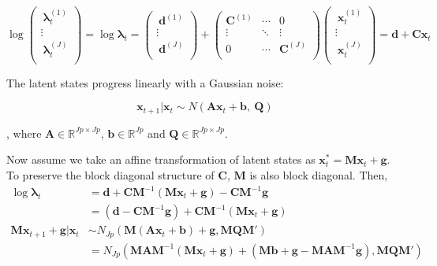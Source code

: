 \documentclass[]{article}
\begin{document}
\[\log{\begin{pmatrix}
		\ \bm{\lambda}_{t}^{(1)} \\
		\vdots \\
		\ \bm{\lambda}_{t}^{(J)} \\
	\end{pmatrix} =}\log\bm{\lambda}_{t} = \begin{pmatrix}
	\ \mathbf{d}^{(1)} \\
	\vdots \\
	\ \mathbf{d}^{(J)} \\
\end{pmatrix} + \begin{pmatrix}
	\mathbf{C}^{(1)} & \cdots & 0 \\
	\vdots & \ddots & \vdots \\
	0 & \cdots & \mathbf{C}^{(J)} \\
\end{pmatrix}\begin{pmatrix}
	\ \mathbf{x}_{t}^{(1)} \\
	\vdots \\
	\ \mathbf{x}_{t}^{(J)} \\
\end{pmatrix} = \mathbf{d} + \mathbf{C}\mathbf{x}_{t}\]

The latent states progress linearly with a Gaussian noise:

\[\mathbf{x}_{t + 1}|\mathbf{x}_{t} \sim N(\mathbf{A}\mathbf{x}_{t} + \mathbf{b},\ \mathbf{Q})\]

, where \(\mathbf{A} \in \mathbb{R}^{Jp \times Jp}\),
\(\mathbf{b} \in \mathbb{R}^{Jp}\) and
\(\mathbf{Q} \in \mathbb{R}^{Jp \times Jp}\).

Now assume we take an affine transformation of latent states as
\(\mathbf{x}_{t}^{*} = \mathbf{M}\mathbf{x}_{t} + \mathbf{g}\). To
preserve the block diagonal structure of \(\mathbf{C}\), \(\mathbf{M}\)
is also block diagonal. Then,
\begin{align*}
	\log\bm{\lambda}_{t} &= \mathbf{d} + \mathbf{C}\mathbf{M}^{- 1}\left( \mathbf{M}\mathbf{x}_{t} + \mathbf{g} \right) - \mathbf{C}\mathbf{M}^{- 1}\mathbf{g}\\
	&= \left( \mathbf{d} - \mathbf{C}\mathbf{M}^{- 1}\mathbf{g} \right) + \mathbf{C}\mathbf{M}^{- 1}(\mathbf{M}\mathbf{x}_{t} + \mathbf{g})\\
	\mathbf{M}\mathbf{x}_{t + 1} + \mathbf{g}|\mathbf{x}_{t} &\sim N_{Jp}\left( \mathbf{M}\left( \mathbf{A}\mathbf{x}_{t} + \mathbf{b} \right)+\mathbf{g}, \mathbf{MQM}' \right)\\
	&= N_{Jp}(\mathbf{MAM}^{- 1}\left( \mathbf{M}\mathbf{x}_{t} + \mathbf{g} \right) + \left( \mathbf{Mb} + \mathbf{g} - \mathbf{MAM}^{- 1}\mathbf{g} \right), \mathbf{MQM}')
\end{align*}
\end{document}
